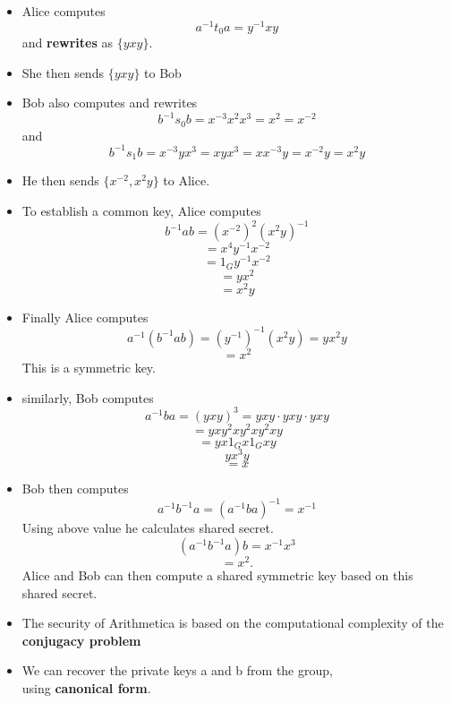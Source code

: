 \documentclass[12pt]{article}
\begin{document}
       \begin{itemize}
          \item Alice computes $$a^{-1}t_0a=y^{-1}xy$$ and \textbf{rewrites} as $\{yxy\}$.
          \item She then sends $\{yxy\}$ to Bob
          \vspace{3mm}
          \item Bob also computes and rewrites
          $$b^{-1}s_0b=x^{-3}x^2x^3=x^2=x^{-2}$$ and
          $$b^{-1}s_1b=x^{-3}yx^3=xyx^3=x x^{-3}y=x^{-2}y=x^2y$$
          \item He then sends  $\{x^{-2},x^2y\}$ to Alice.
      \end{itemize}
      \begin{itemize}
          \item To establish a common key, Alice computes \\
          $$b^{-1}ab=(x^{-2})^2(x^2y)^{-1}$$
          $$=x^4y^{-1}x^{-2}$$
          $$=1_Gy^{-1}x^{-2}$$ 
          $$=yx^2$$
          $$=x^2y$$
      \end{itemize}
       \begin{itemize}
       \item Finally Alice computes 
         $$a^{-1}(b^{-1}ab)=(y^{-1})^{-1}(x^2y)=yx^2y$$
         $$=x^2$$ This is a symmetric key.\\
         \item similarly, Bob computes
         $$a^{-1}ba=(yxy)^3=yxy\cdot yxy \cdot yxy$$
         $$=yxy^2xy^2xy^2xy$$
         $$=yx1_Gx1_Gxy $$
         $$yx^3y$$
         $$=x$$
     \end{itemize}
     \begin{itemize}
          \item Bob then computes\\
          $$a^{-1}b^{-1}a=(a^{-1}ba)^{-1}=x^{-1}$$
          Using above value he calculates shared secret.\\
          $$(a^{-1}b^{-1}a)b=x^{-1}x^3$$
          $$=x^2.$$
          Alice and Bob can then compute a shared symmetric key based on this shared secret.
      \end{itemize}
      \begin{itemize}
          \item  The security of Arithmetica is based on the computational complexity of the \textbf{conjugacy problem}
          \item We can recover the private keys a and b from the group, \\
          using \textbf{canonical form}\cite{stamp2007applied}. 
      \end{itemize}
    			    
\end{document}
